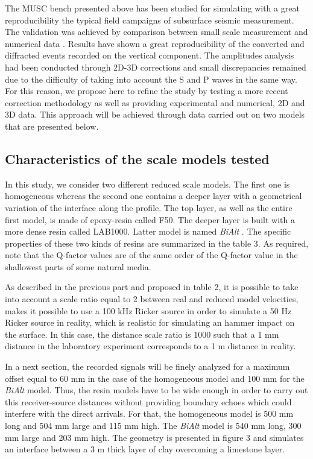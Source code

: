 \documentclass[manuscript,revised]{geophysics}
\newcommand{\bialt}{\textit{BiAlt} }
\begin{document}
\noindent The MUSC bench presented above has been studied for simulating with a great reproducibility the typical field campaigns of subsurface seismic measurement. The validation was achieved by comparison between small scale measurement and numerical data \citep{Bretaudeau_SSM_2011}. Results have shown a great reproducibility of the converted and diffracted events recorded on the vertical component. The amplitudes analysis had been conducted through 2D-3D corrections and small discrepancies remained due to the difficulty of taking into account the S and P waves in the same way. For this reason, we propose here to refine the study by testing a more recent correction methodology \citet{Schafer_LSS_2014} as well as providing experimental and numerical, 2D and 3D data. This approach will be achieved through data carried out on two models that are presented below.


\subsection{Characteristics of the scale models tested}

\noindent In this study, we consider two different reduced scale models. The first one is homogeneous whereas the second one contains a deeper layer with a geometrical variation of the interface along the profile. The top layer, as well as the entire first model, is made of epoxy-resin called F50. The deeper layer is built with a more dense resin called LAB1000. Latter model is named \bialt. The specific properties of these two kinds of resins are summarized in the table 3. As required, note that the Q-factor values are of the same order of the Q-factor value in the shallowest parts of some natural media.

\noindent As described in the previous part and proposed in table 2, it is possible to take into account a scale ratio equal to 2 between real and reduced model velocities, makes it possible to use a 100 kHz Ricker source in order to simulate a 50 Hz Ricker source in reality, which is realistic for simulating an hammer impact on the surface. In this case, the distance scale ratio is 1000 such that a 1 mm distance in the laboratory experiment corresponds to a 1 m distance in reality. 

\noindent In a next section, the recorded signals will be finely analyzed for a maximum offset equal to 60 mm in the case of the homogeneous model and 100 mm for the \bialt model. Thus, the resin models have to be wide enough in order to carry out this receiver-source distances without providing boundary echoes which could interfere with the direct arrivals. For that, the homogeneous model is 500 mm long and 504 mm large and 115 mm high. The \bialt model is 540 mm long, 300 mm large and 203 mm high. The geometry is presented in figure 3 and simulates an interface between a 3 m thick layer of clay overcoming a limestone layer.
\end{document}
